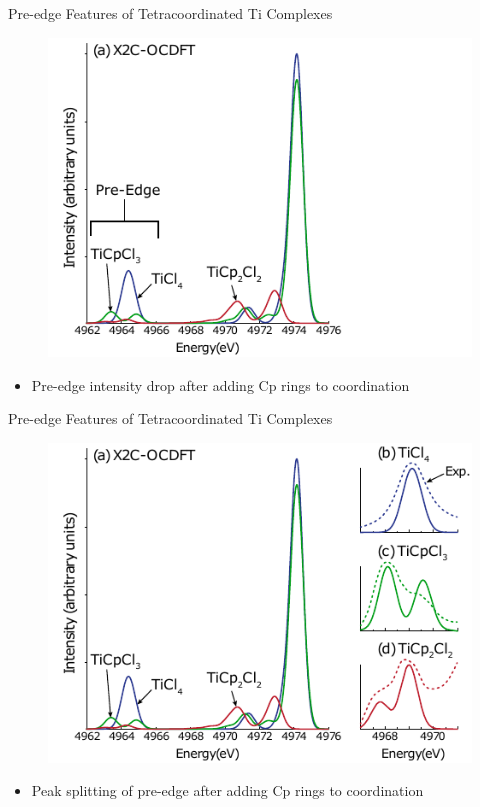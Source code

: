 \documentclass[t]{beamer}
\begin{document}
\begin{frame}{Pre-edge Features of Tetracoordinated Ti Complexes}
\begin{figure}
\includegraphics[scale=1.0]{ti_pre_edge_1.pdf}
\end{figure}
\begin{itemize}
\item Pre-edge intensity drop after adding Cp rings to coordination
\end{itemize}
\end{frame}

\begin{frame}{Pre-edge Features of Tetracoordinated Ti Complexes}
\begin{figure}
\includegraphics[scale=1.0]{ti_pre_edge_2.pdf}
\end{figure}
\begin{itemize}
\item Peak splitting of pre-edge after adding Cp rings to coordination
\end{itemize}
\end{frame}
\end{document}
